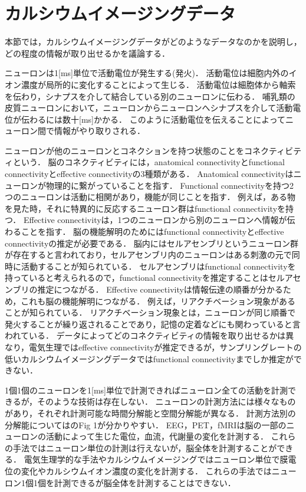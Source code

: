 \section{カルシウムイメージングデータ}
本節では，カルシウムイメージングデータがどのようなデータなのかを説明し，どの程度の情報が取り出せるかを議論する．

ニューロンは1[ms]単位で活動電位が発生する(発火)．
活動電位は細胞内外のイオン濃度が局所的に変化することによって生じる．
活動電位は細胞体から軸索を伝わり，シナプスを介して結合している別のニューロンに伝わる．
哺乳類の皮質ニューロンにおいて，ニューロンからニューロンへシナプスを介して活動電位が伝わるには数十[ms]かかる\cite{Izhikevich2004}．
このように活動電位を伝えることによってニューロン間で情報がやり取りされる．

ニューロンが他のニューロンとコネクションを持つ状態のことをコネクティビティという．
脳のコネクティビティには，anatomical connectivityとfunctional connectivityとeffective connectivityの3種類がある\cite{Sporns2007}．
Anatomical connectivityはニューロンが物理的に繋がっていることを指す．
Functional connectivityを持つ2つのニューロンは活動に相関があり，機能が同じことを指す．
例えば，ある物を見た時，それに特異的に反応するニューロン群はfunctional connectivityを持つ．
Effective connectivityは，1つのニューロンから別のニューロンへ情報が伝わることを指す．
脳の機能解明のためにはfunctional connectivityとeffective connectivityの推定が必要である．
脳内にはセルアセンブリというニューロン群が存在すると言われており\cite{Harris2012}，セルアセンブリ内のニューロンはある刺激の元で同時に活動することが知られている．
セルアセンブリはfunctional connectivityを持っていると考えられるので，functional connectivityを推定することはセルアセンブリの推定につながる．
Effective connectivityは情報伝達の順番が分かるため，これも脳の機能解明につながる．
例えば，リアクチベーション現象があることが知られている．
リアクチベーション現象とは，ニューロンが同じ順番で発火することが繰り返されることであり，記憶の定着などにも関わっていると言われている．
データによってどのコネクティビティの情報を取り出せるかは異なり，電気生理ではeffective connectivityが推定できるが，サンプリングレートの低いカルシウムイメージングデータではfunctional connectivityまでしか推定ができない．

1個1個のニューロンを1[ms]単位で計測できればニューロン全ての活動を計測できるが，そのような技術は存在しない．
ニューロンの計測方法には様々なものがあり，それぞれ計測可能な時間分解能と空間分解能が異なる．
計測方法別の分解能については\cite{Sejnowski2014}のFig 1が分かりやすい．
EEG，PET，fMRIは脳の一部のニューロンの活動によって生じた電位，血流，代謝量の変化を計測する．
これらの手法ではニューロン単位の計測は行えないが，脳全体を計測することができる．
電気生理学的な手法やカルシウムイメージングではニューロン単位で膜電位の変化やカルシウムイオン濃度の変化を計測する．
これらの手法ではニューロン1個1個を計測できるが脳全体を計測することはできない．

